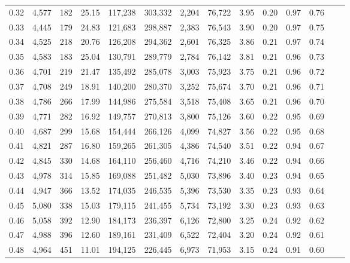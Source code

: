 \begin{tabular}{rrrrrrrrrrrrrr}
0.32 &  4,577 &    182 &   25.15 &  117,238 &  303,332 &   2,204 &  76,722 &  3.95 &  0.20 &  0.97 &      0.76 \\
0.33 &  4,445 &    179 &   24.83 &  121,683 &  298,887 &   2,383 &  76,543 &  3.90 &  0.20 &  0.97 &      0.75 \\
0.34 &  4,525 &    218 &   20.76 &  126,208 &  294,362 &   2,601 &  76,325 &  3.86 &  0.21 &  0.97 &      0.74 \\
0.35 &  4,583 &    183 &   25.04 &  130,791 &  289,779 &   2,784 &  76,142 &  3.81 &  0.21 &  0.96 &      0.73 \\
0.36 &  4,701 &    219 &   21.47 &  135,492 &  285,078 &   3,003 &  75,923 &  3.75 &  0.21 &  0.96 &      0.72 \\
0.37 &  4,708 &    249 &   18.91 &  140,200 &  280,370 &   3,252 &  75,674 &  3.70 &  0.21 &  0.96 &      0.71 \\
0.38 &  4,786 &    266 &   17.99 &  144,986 &  275,584 &   3,518 &  75,408 &  3.65 &  0.21 &  0.96 &      0.70 \\
0.39 &  4,771 &    282 &   16.92 &  149,757 &  270,813 &   3,800 &  75,126 &  3.60 &  0.22 &  0.95 &      0.69 \\
0.40 &  4,687 &    299 &   15.68 &  154,444 &  266,126 &   4,099 &  74,827 &  3.56 &  0.22 &  0.95 &      0.68 \\
0.41 &  4,821 &    287 &   16.80 &  159,265 &  261,305 &   4,386 &  74,540 &  3.51 &  0.22 &  0.94 &      0.67 \\
0.42 &  4,845 &    330 &   14.68 &  164,110 &  256,460 &   4,716 &  74,210 &  3.46 &  0.22 &  0.94 &      0.66 \\
0.43 &  4,978 &    314 &   15.85 &  169,088 &  251,482 &   5,030 &  73,896 &  3.40 &  0.23 &  0.94 &      0.65 \\
0.44 &  4,947 &    366 &   13.52 &  174,035 &  246,535 &   5,396 &  73,530 &  3.35 &  0.23 &  0.93 &      0.64 \\
0.45 &  5,080 &    338 &   15.03 &  179,115 &  241,455 &   5,734 &  73,192 &  3.30 &  0.23 &  0.93 &      0.63 \\
0.46 &  5,058 &    392 &   12.90 &  184,173 &  236,397 &   6,126 &  72,800 &  3.25 &  0.24 &  0.92 &      0.62 \\
0.47 &  4,988 &    396 &   12.60 &  189,161 &  231,409 &   6,522 &  72,404 &  3.20 &  0.24 &  0.92 &      0.61 \\
0.48 &  4,964 &    451 &   11.01 &  194,125 &  226,445 &   6,973 &  71,953 &  3.15 &  0.24 &  0.91 &      0.60 \\

\end{tabular}
